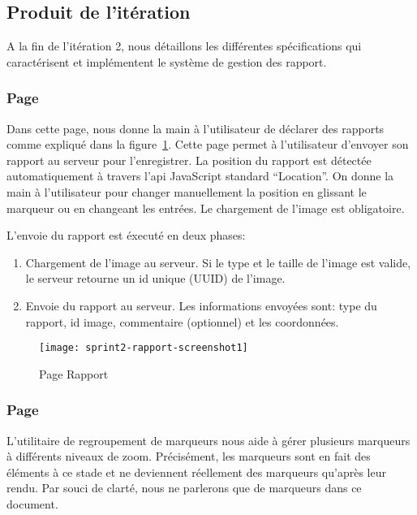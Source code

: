 \subsection{Produit de l'itération}

A la fin de l'itération 2, nous détaillons les différentes spécifications qui
caractérisent et implémentent le système de gestion des rapport.

\subsubsection{Page }

Dans cette page, nous donne la main à l'utilisateur de déclarer des rapports
comme expliqué dans la figure~\ref{fig:sprint2-rapport-screenshot1}. Cette page
permet à l'utilisateur d'envoyer son rapport au serveur pour l'enregistrer. La
position du rapport est détectée automatiquement à travers l'api JavaScript
standard ``Location''. On donne la main à l'utilisateur pour changer
manuellement la position en glissant le marqueur ou en changeant les entrées.
Le chargement de l'image est obligatoire.

L'envoie du rapport est éxecuté en deux phases:

\begin{enumerate}
    \item Chargement de l'image au serveur. Si le type et le taille de l'image
        est valide, le serveur retourne un id unique (UUID) de l'image.
    \item Envoie du rapport au serveur. Les informations envoyées sont: type du
        rapport, id image, commentaire (optionnel) et les coordonnées.
\end{enumerate}

\begin{figure}[H]
    \centering
    \texttt{[image: sprint2-rapport-screenshot1]}
    \caption{Page Rapport}
\label{fig:sprint2-rapport-screenshot1}
\end{figure}

\subsubsection{Page }

L'utilitaire de regroupement de marqueurs nous aide à gérer plusieurs marqueurs
à différents niveaux de zoom. Précisément, les marqueurs sont en fait des
éléments à ce stade et ne deviennent réellement des marqueurs qu'après leur
rendu. Par souci de clarté, nous ne parlerons que de marqueurs dans ce
document.

